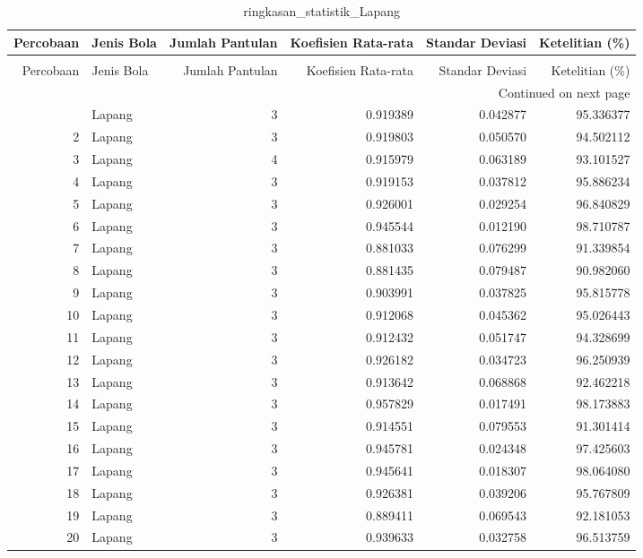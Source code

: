 \begin{longtable}{rlrrrr}
\caption{ringkasan_statistik_Lapang} \label{tab:ringkasan_Lapang} \\
\toprule
Percobaan & Jenis Bola & Jumlah Pantulan & Koefisien Rata-rata & Standar Deviasi & Ketelitian (\%) \\
\midrule
\endfirsthead
\caption[]{ringkasan_statistik_Lapang} \\
\toprule
Percobaan & Jenis Bola & Jumlah Pantulan & Koefisien Rata-rata & Standar Deviasi & Ketelitian (\%) \\
\midrule
\endhead
\midrule
\multicolumn{6}{r}{Continued on next page} \\
\midrule
\endfoot
\bottomrule
\endlastfoot
1 & Lapang & 3 & 0.919389 & 0.042877 & 95.336377 \\
2 & Lapang & 3 & 0.919803 & 0.050570 & 94.502112 \\
3 & Lapang & 4 & 0.915979 & 0.063189 & 93.101527 \\
4 & Lapang & 3 & 0.919153 & 0.037812 & 95.886234 \\
5 & Lapang & 3 & 0.926001 & 0.029254 & 96.840829 \\
6 & Lapang & 3 & 0.945544 & 0.012190 & 98.710787 \\
7 & Lapang & 3 & 0.881033 & 0.076299 & 91.339854 \\
8 & Lapang & 3 & 0.881435 & 0.079487 & 90.982060 \\
9 & Lapang & 3 & 0.903991 & 0.037825 & 95.815778 \\
10 & Lapang & 3 & 0.912068 & 0.045362 & 95.026443 \\
11 & Lapang & 3 & 0.912432 & 0.051747 & 94.328699 \\
12 & Lapang & 3 & 0.926182 & 0.034723 & 96.250939 \\
13 & Lapang & 3 & 0.913642 & 0.068868 & 92.462218 \\
14 & Lapang & 3 & 0.957829 & 0.017491 & 98.173883 \\
15 & Lapang & 3 & 0.914551 & 0.079553 & 91.301414 \\
16 & Lapang & 3 & 0.945781 & 0.024348 & 97.425603 \\
17 & Lapang & 3 & 0.945641 & 0.018307 & 98.064080 \\
18 & Lapang & 3 & 0.926381 & 0.039206 & 95.767809 \\
19 & Lapang & 3 & 0.889411 & 0.069543 & 92.181053 \\
20 & Lapang & 3 & 0.939633 & 0.032758 & 96.513759 \\
\end{longtable}

